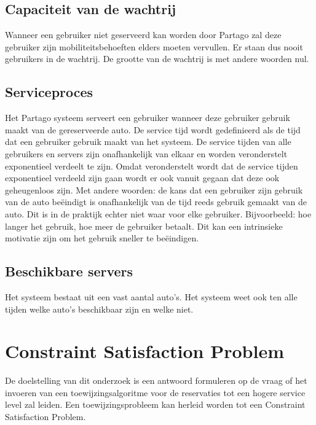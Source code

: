 \subsection{Capaciteit van de wachtrij}
Wanneer een gebruiker niet geserveerd kan worden door Partago zal deze gebruiker zijn mobiliteitsbehoeften elders moeten vervullen. Er staan dus nooit gebruikers in de wachtrij. De grootte van de wachtrij is met andere woorden nul.

\subsection{Serviceproces}
Het Partago systeem serveert een gebruiker wanneer deze gebruiker gebruik maakt van de gereserveerde auto. De service tijd wordt gedefinieerd als de tijd dat een gebruiker gebruik maakt van het systeem. De service tijden van alle gebruikers en servers zijn onafhankelijk van elkaar en worden veronderstelt exponentieel verdeelt te zijn. Omdat veronderstelt wordt dat de service tijden exponentieel verdeeld zijn gaan wordt er ook vanuit gegaan dat deze ook geheugenloos zijn. Met andere woorden: de kans dat een gebruiker zijn gebruik van de auto beëindigt is onafhankelijk van de tijd reeds gebruik gemaakt van de auto. Dit is in de praktijk echter niet waar voor elke gebruiker. Bijvoorbeeld: hoe langer het gebruik, hoe meer de gebruiker betaalt. Dit kan een intrinsieke motivatie zijn om het gebruik sneller te beëindigen.

\subsection{Beschikbare servers}
Het systeem bestaat uit een vast aantal auto's. Het systeem weet ook ten alle tijden welke auto's beschikbaar zijn en welke niet.

\section{Constraint Satisfaction Problem}

De doelstelling van dit onderzoek is een antwoord formuleren op de vraag of het invoeren van een toewijzingsalgoritme voor de reservaties tot een hogere service level zal leiden. Een toewijzingsprobleem kan herleid worden tot een Constraint Satisfaction Problem.

